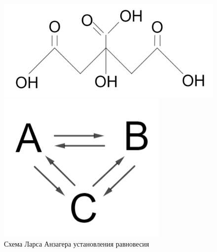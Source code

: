 \begin{lecture}
\begin{lecSection}
	\begin{figure}[H]
	\begin{minipage}[h]{0.26\linewidth}
		\centering\includegraphics[width=\linewidth]{lecture_05/pic1}
			\caption{$pK_A = 3,13$}
	\end{minipage}
	\hfill
	\begin{minipage}[h]{0.30\linewidth}
		\centering\includegraphics[width=\linewidth]{lecture_05/pic2}
			\caption{Схема Ларса Анзагера установления равновесия}
	\end{minipage}
	\hfill
	\begin{minipage}[h]{0.28\linewidth}

\end{minipage}
\end{figure}
\end{lecSection}
\end{lecture}
